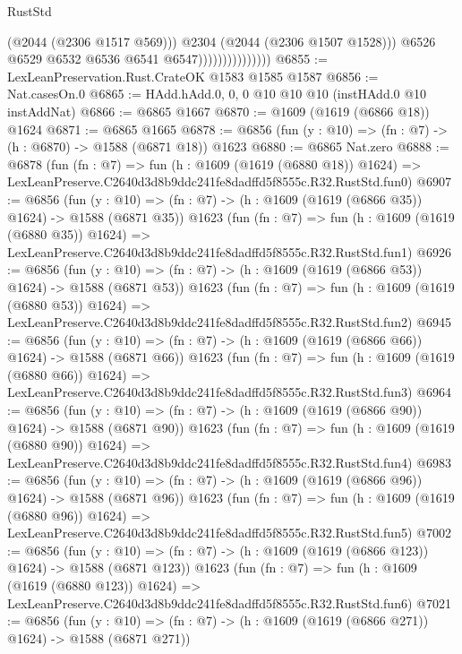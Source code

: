 \begin{lexlean}{RustStd}
\begin{coremodule}
                                      (@2044 (@2306 @1517 @569)))
                                    @2304
                                    (@2044 (@2306 @1507 @1528)))
                                  @6526
                                  @6529
                                  @6532
                                  @6536
                                  @6541
                                  @6547)))))))))))))))
@6855 := LexLeanPreservation.Rust.CrateOK @1583 @1585 @1587
@6856 := Nat.casesOn.{0}
@6865 := HAdd.hAdd.{0, 0, 0} @10 @10 @10 (instHAdd.{0} @10 instAddNat)
@6866 := @6865 @1667
@6870 := @1609 (@1619 (@6866 @18)) @1624
@6871 := @6865 @1665
@6878 := @6856 (fun (y : @10) => (fn : @7) -> (h : @6870) -> @1588 (@6871 @18)) @1623
@6880 := @6865 Nat.zero
@6888 := @6878
    (fun (fn : @7) =>
    fun (h : @1609 (@1619 (@6880 @18)) @1624) =>
    LexLeanPreserve.C2640d3d8b9ddc241fe8dadffd5f8555c.R32.RustStd.fun0)
@6907 := @6856
    (fun (y : @10) => (fn : @7) -> (h : @1609 (@1619 (@6866 @35)) @1624) -> @1588 (@6871 @35))
    @1623
    (fun (fn : @7) =>
    fun (h : @1609 (@1619 (@6880 @35)) @1624) =>
    LexLeanPreserve.C2640d3d8b9ddc241fe8dadffd5f8555c.R32.RustStd.fun1)
@6926 := @6856
    (fun (y : @10) => (fn : @7) -> (h : @1609 (@1619 (@6866 @53)) @1624) -> @1588 (@6871 @53))
    @1623
    (fun (fn : @7) =>
    fun (h : @1609 (@1619 (@6880 @53)) @1624) =>
    LexLeanPreserve.C2640d3d8b9ddc241fe8dadffd5f8555c.R32.RustStd.fun2)
@6945 := @6856
    (fun (y : @10) => (fn : @7) -> (h : @1609 (@1619 (@6866 @66)) @1624) -> @1588 (@6871 @66))
    @1623
    (fun (fn : @7) =>
    fun (h : @1609 (@1619 (@6880 @66)) @1624) =>
    LexLeanPreserve.C2640d3d8b9ddc241fe8dadffd5f8555c.R32.RustStd.fun3)
@6964 := @6856
    (fun (y : @10) => (fn : @7) -> (h : @1609 (@1619 (@6866 @90)) @1624) -> @1588 (@6871 @90))
    @1623
    (fun (fn : @7) =>
    fun (h : @1609 (@1619 (@6880 @90)) @1624) =>
    LexLeanPreserve.C2640d3d8b9ddc241fe8dadffd5f8555c.R32.RustStd.fun4)
@6983 := @6856
    (fun (y : @10) => (fn : @7) -> (h : @1609 (@1619 (@6866 @96)) @1624) -> @1588 (@6871 @96))
    @1623
    (fun (fn : @7) =>
    fun (h : @1609 (@1619 (@6880 @96)) @1624) =>
    LexLeanPreserve.C2640d3d8b9ddc241fe8dadffd5f8555c.R32.RustStd.fun5)
@7002 := @6856
    (fun (y : @10) => (fn : @7) -> (h : @1609 (@1619 (@6866 @123)) @1624) -> @1588 (@6871 @123))
    @1623
    (fun (fn : @7) =>
    fun (h : @1609 (@1619 (@6880 @123)) @1624) =>
    LexLeanPreserve.C2640d3d8b9ddc241fe8dadffd5f8555c.R32.RustStd.fun6)
@7021 := @6856
    (fun (y : @10) => (fn : @7) -> (h : @1609 (@1619 (@6866 @271)) @1624) -> @1588 (@6871 @271))

\end{coremodule}
\end{lexlean}
